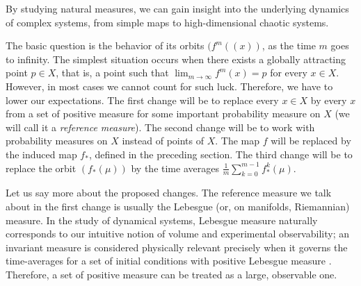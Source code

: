\documentclass[format=acmsmall, authorversion, screen=true]{acmart}
\begin{document}
By studying natural measures, we can gain insight into the underlying dynamics of complex systems, from simple maps to high-dimensional chaotic systems.

The basic question is the behavior of its orbits $(f^m((x))$, as the time $m$ goes to infinity. 
The simplest situation occurs when there
exists a globally attracting point $p\in X$, that is, a point such
that $\lim_{m\to\infty}f^m(x)=p$ for every $x\in X$. However, in most
cases we cannot count for such luck. Therefore, we have to lower our
expectations. The first change will be to replace every $x\in X$ by
every $x$ from a set of positive measure for some important
probability measure on $X$ (we will call it a \emph{reference measure}).
The second change will be to work with probability measures on $X$
instead of points of $X$. The map $f$ will be replaced by the induced
map $f_*$, defined in the preceding section. The third change will be
to replace the orbit $(f_*(\mu))$ by the time averages
$\frac1m\sum_{k=0}^{m-1}f_*^k(\mu)$.


Let us say more about the proposed changes. The reference measure we talk about in the first change is usually the Lebesgue (or, on manifolds, Riemannian) measure. In the study of dynamical systems, Lebesgue measure naturally corresponds to our intuitive notion of volume and experimental observability; an invariant measure is considered physically relevant precisely when it governs the time-averages for a set of initial conditions with positive Lebesgue measure \cite{young2002srb}. Therefore, a set of positive measure can be treated as a large, observable one.
\end{document}
